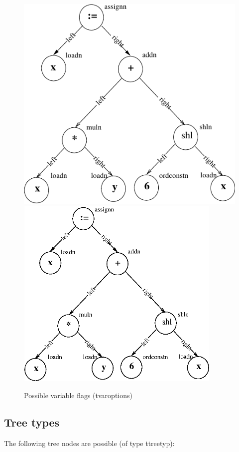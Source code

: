 \documentclass [12pt]{article}
\begin{document}
\begin{figure}
\ifpdf
\includegraphics{arch3.pdf}
\else
\includegraphics[width=3.88in,height=3.65in]{arch3.eps}
\fi
\caption{Possible variable flags (tvaroptions)}
\label{fig3}
\end{figure}

\subsection{Tree types}

The following tree nodes are possible (of type \textsf{ttreetyp):}
\end{document}
